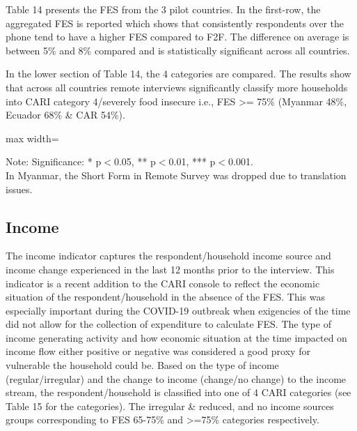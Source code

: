 \documentclass[11pt,harvard]{article}
\begin{document}
Table 14 presents the FES from the 3 pilot countries. In the first-row, the aggregated FES is reported which shows that consistently respondents over the phone tend to have a higher FES compared to F2F. The difference on average is between 5\% and 8\% compared and is statistically significant across all countries. 

In the lower section of Table 14, the 4 categories are compared. The results show that across all countries remote interviews significantly classify more households into CARI category 4/severely food insecure i.e., FES >= 75\% (Myanmar 48\%, Ecuador 68\% \& CAR 54\%).

\begin{table}[htbp]
	\centering
	\begin{adjustbox}{max width=\textwidth}
		\begin{threeparttable}
			\caption{Impact of Survey Modality on Expenditure and Food Expenditure Share}
			\scriptsize
			 
			\label{tab:FES_Modality_All_Country}
			\begin{tablenotes}
				\item Note: Significance: * p$<$0.05, ** p$<$0.01, *** p$<$0.001. \\ 
				In Myanmar, the Short Form in Remote Survey was dropped due to translation issues.
			\end{tablenotes}
		\end{threeparttable}
	\end{adjustbox}
\end{table}

\pagebreak

\subsection{Income}

The income indicator captures the respondent/household income source and income change experienced in the last 12 months prior to the interview. This indicator is a recent addition to the CARI console to reflect the economic situation of the respondent/household in the absence of the FES. This was especially important during the COVID-19 outbreak when exigencies of the time did not allow for the collection of expenditure to calculate FES. The type of income generating activity and how economic situation at the time impacted on income flow either positive or negative was considered a good proxy for vulnerable the household could be. Based on the type of income (regular/irregular) and the change to income (change/no change) to the income stream, the respondent/household is classified into one of 4 CARI categories (see Table 15 for the categories). The irregular \& reduced, and no income sources groups corresponding to FES 65-75\% and >=75\% categories respectively.
\end{document}
